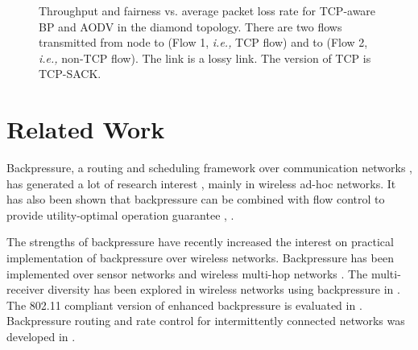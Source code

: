 \documentclass[conference]{IEEEtran}
\newcommand{\ie}{{\em i.e., }}
\begin{document}
\begin{figure}[t!]
\vspace{-0pt}
\begin{center}
\end{center}
\begin{center}
\vspace{-5pt}
\caption{\label{fig:diamond_thrpt_vs_loss_sack_UDP_TCP} \scriptsize Throughput and fairness vs. average packet loss rate for TCP-aware BP and AODV in the diamond topology. There are two flows transmitted from node  to  (Flow 1, \ie TCP flow) and  to  (Flow 2, \ie non-TCP flow). The link  is a lossy link. The version of TCP is TCP-SACK.
}
\end{center}
\vspace{-25pt}
\end{figure}






\section{Related Work}\label{sec:related}
Backpressure, a routing and scheduling framework over communication networks \cite{tass_eph1}, \cite{tass_eph2} has generated a lot of research interest \cite{neely_book}, mainly in wireless ad-hoc networks. It has also been shown that backpressure can be combined with flow control to provide utility-optimal operation guarantee \cite{neely_mod}, \cite{stolyar_greedy}.

The strengths of backpressure have recently increased the interest on practical implementation of backpressure over wireless networks. Backpressure has been implemented over sensor networks \cite{routing_wtht_routes} and wireless multi-hop networks \cite{xpress}. The multi-receiver diversity has been explored in wireless networks using backpressure in \cite{javidi_diversity}. The 802.11 compliant version of enhanced backpressure is evaluated in \cite{choumas}. Backpressure routing and rate control for intermittently connected networks was developed in \cite{backpressure_for_icns}. 
\end{document}
